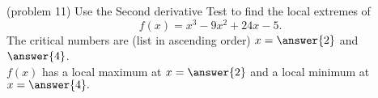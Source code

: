 \documentclass[handout]{ximera}
\begin{document}
\begin{problem}(problem 11)
Use the Second derivative Test to find the local extremes of
\[
f(x) = x^3 - 9x^2 + 24x - 5.
\]
The critical numbers are (list in ascending order) $x= \answer{2}$ and $\answer{4}$.\\
$f(x)$ has a local maximum at $x = \answer{2}$ and a local minimum at $x = \answer{4}.$
\end{problem}
\end{document}
